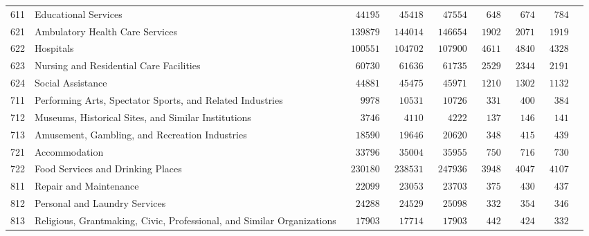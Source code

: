 \documentclass[9pt, oneside]{article}   	%
\begin{document}
\begin{longtable}{lp{3 in}ccccccc}
611  & Educational Services & $\phantom{00}44195$ & $\phantom{00}45418$ & $\phantom{00}47554$ & $\phantom{00}648$ & $\phantom{00}674$ & $\phantom{00}784$ \\
621  & Ambulatory Health Care Services & $\phantom{0}139879$ & $\phantom{0}144014$ & $\phantom{0}146654$ & $\phantom{0}1902$ & $\phantom{0}2071$ & $\phantom{0}1919$ \\
622  & Hospitals & $\phantom{0}100551$ & $\phantom{0}104702$ & $\phantom{0}107900$ & $\phantom{0}4611$ & $\phantom{0}4840$ & $\phantom{0}4328$ \\
623  & Nursing and Residential Care Facilities & $\phantom{00}60730$ & $\phantom{00}61636$ & $\phantom{00}61735$ & $\phantom{0}2529$ & $\phantom{0}2344$ & $\phantom{0}2191$ \\
624  & Social Assistance & $\phantom{00}44881$ & $\phantom{00}45475$ & $\phantom{00}45971$ & $\phantom{0}1210$ & $\phantom{0}1302$ & $\phantom{0}1132$ \\
711  & Performing Arts, Spectator Sports, and Related Industries & $\phantom{000}9978$ & $\phantom{00}10531$ & $\phantom{00}10726$ & $\phantom{00}331$ & $\phantom{00}400$ & $\phantom{00}384$ \\
712  & Museums, Historical Sites, and Similar Institutions & $\phantom{000}3746$ & $\phantom{000}4110$ & $\phantom{000}4222$ & $\phantom{00}137$ & $\phantom{00}146$ & $\phantom{00}141$ \\
713  & Amusement, Gambling, and Recreation Industries & $\phantom{00}18590$ & $\phantom{00}19646$ & $\phantom{00}20620$ & $\phantom{00}348$ & $\phantom{00}415$ & $\phantom{00}439$ \\
721  & Accommodation & $\phantom{00}33796$ & $\phantom{00}35004$ & $\phantom{00}35955$ & $\phantom{00}750$ & $\phantom{00}716$ & $\phantom{00}730$ \\
722  & Food Services and Drinking Places & $\phantom{0}230180$ & $\phantom{0}238531$ & $\phantom{0}247936$ & $\phantom{0}3948$ & $\phantom{0}4047$ & $\phantom{0}4107$ \\
811  & Repair and Maintenance & $\phantom{00}22099$ & $\phantom{00}23053$ & $\phantom{00}23703$ & $\phantom{00}375$ & $\phantom{00}430$ & $\phantom{00}437$ \\
812  & Personal and Laundry Services & $\phantom{00}24288$ & $\phantom{00}24529$ & $\phantom{00}25098$ & $\phantom{00}332$ & $\phantom{00}354$ & $\phantom{00}346$ \\
813  & Religious, Grantmaking, Civic, Professional, and Similar Organizations & $\phantom{00}17903$ & $\phantom{00}17714$ & $\phantom{00}17903$ & $\phantom{00}442$ & $\phantom{00}424$ & $\phantom{00}332$ \\

\end{longtable}
\end{document}

